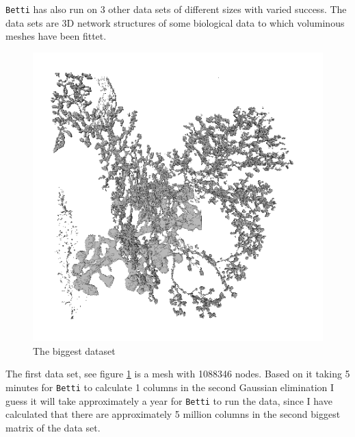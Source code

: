 \documentclass[11pt,a4paper,twoside, openright]{report}
\begin{document}
\texttt{Betti} has also run on 3 other data sets of different sizes with varied success. 
The data sets are 3D network structures of some biological data to which voluminous meshes have been fittet.
\begin{figure}[H]
\center
\includegraphics[scale=0.5]{downsampled00.png}
\caption{The biggest dataset}
\label{fig:mesh_down}
\end{figure}
The first data set, see figure \ref{fig:mesh_down} is a mesh with 1088346 nodes. Based on it taking 5 minutes for \texttt{Betti} to calculate 1 columns in the second Gaussian elimination I guess it will take approximately a year for \texttt{Betti} to run the data, since I have calculated that there are approximately 5 million columns in the second biggest matrix of the data set. 
\end{document}

